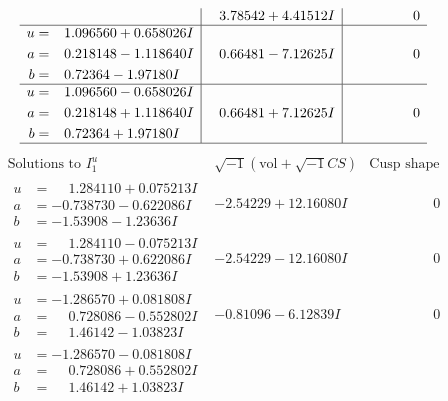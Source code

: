 \documentclass[1p]{elsarticle_modified}
\theoremstyle{definition}
\newcommand{\I}{\sqrt{-1}}
\begin{document}
$$\begin{array}{c|c|c}
 & \phantom{-}3.78542 + 4.41512 I & \phantom{-0.000000 } 0 \\ \hline\begin{aligned}
u &= \phantom{-}1.096560 + 0.658026 I \\
a &= \phantom{-}0.218148 - 1.118640 I \\
b &= \phantom{-}0.72364 - 1.97180 I\end{aligned}
 & \phantom{-}0.66481 - 7.12625 I & \phantom{-0.000000 } 0 \\ \hline\begin{aligned}
u &= \phantom{-}1.096560 - 0.658026 I \\
a &= \phantom{-}0.218148 + 1.118640 I \\
b &= \phantom{-}0.72364 + 1.97180 I\end{aligned}
 & \phantom{-}0.66481 + 7.12625 I & \phantom{-0.000000 } 0\\
 \hline 
 \end{array}$$\newpage$$\begin{array}{c|c|c}  
\text{Solutions to }I^u_{1}& \I (\text{vol} + \sqrt{-1}CS) & \text{Cusp shape}\\
 \hline 
\begin{aligned}
u &= \phantom{-}1.284110 + 0.075213 I \\
a &= -0.738730 - 0.622086 I \\
b &= -1.53908 - 1.23636 I\end{aligned}
 & -2.54229 + 12.16080 I & \phantom{-0.000000 } 0 \\ \hline\begin{aligned}
u &= \phantom{-}1.284110 - 0.075213 I \\
a &= -0.738730 + 0.622086 I \\
b &= -1.53908 + 1.23636 I\end{aligned}
 & -2.54229 - 12.16080 I & \phantom{-0.000000 } 0 \\ \hline\begin{aligned}
u &= -1.286570 + 0.081808 I \\
a &= \phantom{-}0.728086 - 0.552802 I \\
b &= \phantom{-}1.46142 - 1.03823 I\end{aligned}
 & -0.81096 - 6.12839 I & \phantom{-0.000000 } 0 \\ \hline\begin{aligned}
u &= -1.286570 - 0.081808 I \\
a &= \phantom{-}0.728086 + 0.552802 I \\
b &= \phantom{-}1.46142 + 1.03823 I\end{aligned}

\end{array}$$
\end{document}
